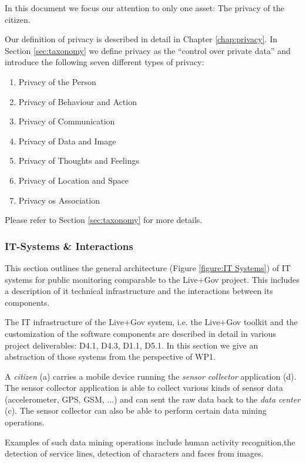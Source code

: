In this document we focus our attention to only one asset: The privacy of the citizen.

Our definition of privacy is described in detail in Chapter \ref{chap:privacy}. In Section \ref{sec:taxonomy} we define privacy as the ``control over private data'' and introduce the following seven different types of privacy:
\begin{enumerate}
\item Privacy of the Person
\item Privacy of Behaviour and Action
\item Privacy of Communication
\item Privacy of Data and Image
\item Privacy of Thoughts and Feelings
\item Privacy of Location and Space
\item Privacy os Association
\end{enumerate}

Please refer to Section \ref{sec:taxonomy} for more details.

\subsubsection{IT-Systems \& Interactions}
\label{subsubsection:it-systems}

This section outlines the general architecture (Figure \ref{figure:IT Systems}) of IT systems for public monitoring comparable to the Live+Gov project.
This includes a description of it technical infrastructure and the interactions between its components.

The IT infrastructure of the Live+Gov system, i.e. the Live+Gov toolkit and the customization of the software components are described in detail in various project deliverables: D4.1, D4.3, D1.1, D5.1.
In this section we give an abstraction of those systems from the perspective of WP1.



A \emph{citizen} (a) carries a mobile device running the \emph{sensor collector} application (d).
The sensor collector application is able to collect various kinds of sensor data (accelerometer, GPS, GSM, ...) and can sent the raw data back to the \emph{data center} (c).
The sensor collector can also be able to perform certain data mining operations.

Examples of such data mining operations include human activity recognition,the detection of service lines, detection of characters and faces from images.


